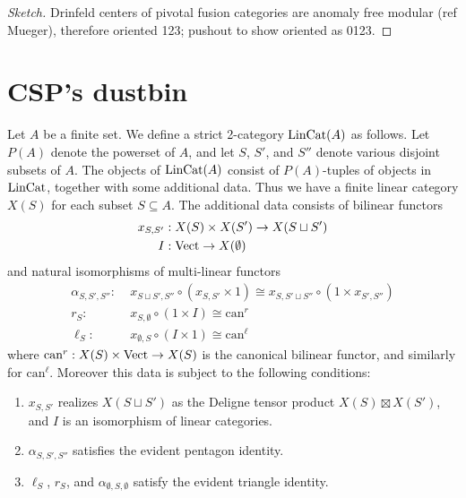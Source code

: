 \documentclass{amsart}
\begin{document}
\begin{proof}[Sketch]
Drinfeld centers of pivotal fusion categories are anomaly free modular (ref Mueger), therefore oriented 123; pushout to show oriented as 0123.
\end{proof}





\section{CSP's dustbin}

Let $A$ be a finite set. We define a strict 2-category $\mathrm{LinCat}(A)$ as follows. Let $P(A)$ denote the powerset of $A$, and let $S$, $S'$, and $S''$ denote various disjoint subsets of $A$. The objects of $\mathrm{LinCat}(A)$ consist of  $P(A)$-tuples of objects in $\mathrm{LinCat}$, together with some additional data. Thus we have a finite linear category $X(S)$ for each subset $S \subseteq A$. The additional data consists of bilinear functors
\begin{align*}
		x_{S,S'}: & \; X(S) \times X(S') \to X(S \sqcup S') \\
		I: & \; \mathrm{Vect} \to X(\emptyset)
\end{align*}
and natural isomorphisms of multi-linear functors
\begin{align*}
		\alpha_{S, S', S''}:  & \; x_{S \sqcup S', S''}\circ (x_{S,S'} \times 1) \cong x_{S, S' \sqcup S''} \circ (1 \times x_{S', S''}) \\
		r_S: & \; x_{S, \emptyset} \circ (1 \times I)  \cong  \textrm{can}^r \\
		\ell_{S}: & \; x_{ \emptyset, S} \circ (I \times 1)  \cong  \textrm{can}^\ell
\end{align*}
where $\textrm{can}^r: X(S) \times \mathrm{Vect} \to X(S)$ is the canonical bilinear functor, and similarly for $\textrm{can}^\ell$. 
Moreover this data is subject to the following conditions: 
\begin{enumerate}
	\item $x_{S,S'}$ realizes $X(S \sqcup S')$ as the Deligne tensor product  $X(S) \boxtimes X(S') $, and $I$ is an isomorphism of linear categories. 
	\item $	\alpha_{S, S', S''}$ satisfies the evident pentagon identity. 
	\item $\ell_S$, $r_S$, and $\alpha_{\emptyset, S, \emptyset}$ satisfy the evident triangle identity.
\end{enumerate}
\end{document}
